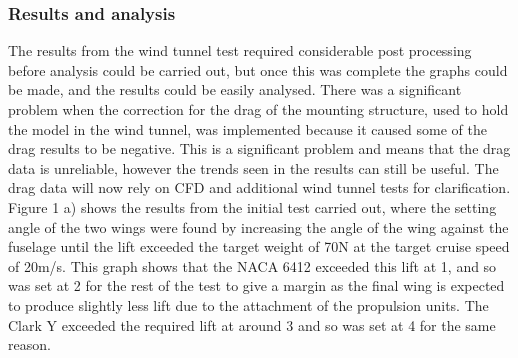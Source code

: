 \documentclass[../../main.tex]{subfiles}
\begin{document}
\subsubsection{Results and analysis} \label{sec:design-process:interim-design-review:wind-tunnel-test:results-and-analysis}


The results from the wind tunnel test required considerable post processing before analysis could be carried out, but once this was complete the graphs could be made, and the results could be easily analysed.
There was a significant problem when the correction for the drag of the mounting structure, used to hold the model in the wind tunnel, was implemented because it caused some of the drag results to be negative.
This is a significant problem and means that the drag data is unreliable, however the trends seen in the results can still be useful.
The drag data will now rely on CFD and additional wind tunnel tests for clarification.
Figure 1 a) shows the results from the initial test carried out, where the setting angle of the two wings were found by increasing the angle of the wing against the fuselage until the lift exceeded the target weight of 70N at the target cruise speed of 20m/s.
This graph shows that the NACA 6412 exceeded this lift at 1, and so was set at 2 for the rest of the test to give a margin as the final wing is expected to produce slightly less lift due to the attachment of the propulsion units.
The Clark Y exceeded the required lift at around 3 and so was set at 4 for the same reason. 
\end{document}
